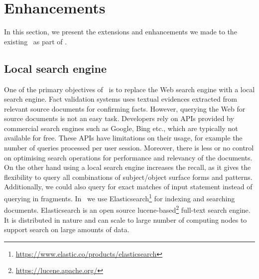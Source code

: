 \section{Enhancements}
\label{sec:enhancements}
In this section, we present the extensions and enhancements we made to the existing \DeFacto\ as part of \FactCheck.%

\subsection{Local search engine}
One of the primary objectives of \FactCheck\ is to replace the Web search engine with a local search engine. Fact validation systems uses textual evidences extracted from relevant source documents for confirming facts. However, querying the Web for source documents is not an easy task. Developers rely on APIs provided by commercial search engines such as Google, Bing etc., which are typically not available for free. These APIs have limitations on their usage, for example the number of queries processed per user session. Moreover, there is less or no control on optimising search operations for performance and relevancy of the documents. On the other hand using a local search engine increases the recall, as it gives the flexibility to query all combinations of subject/object surface forms and patterns. Additionally, we could also query for exact matches of input statement instead of querying in fragments. In \FactCheck\ we use Elasticsearch\footnote{\url{https://www.elastic.co/products/elasticsearch}}
for indexing and searching documents. Elasticsearch is an open source lucene-based\footnote{\url{https://lucene.apache.org/}} full-text search engine. It is distributed in nature and can scale to large number of computing nodes to support search on large amounts of data.


